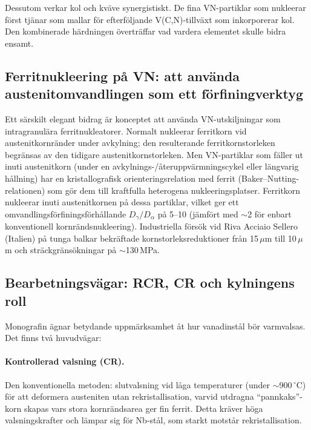 \documentclass[11pt,a4paper]{article}
\begin{document}
Dessutom verkar kol och kv\"ave synergistiskt.  De fina VN-partiklar som
nukleerar f\"orst tj\"anar som mallar f\"or efterf\"oljande V(C,N)-tillv\"axt
som inkorporerar kol.  Den kombinerade h\"ardningen \"overtr\"affar
vad vardera elementet skulle bidra ensamt.

\subsection{Ferritnukleering p\aa{} VN: att anv\"anda austenitomvandlingen
  som ett f\"orfiningverktyg}

Ett s\"arskilt elegant bidrag \"ar konceptet att anv\"anda
VN-utskiljningar som intragranul\"ara ferritnukleatorer.  Normalt
nukleerar ferritkorn vid austenitkornr\"ander under avkylning; den
resulterande ferritkornstorleken begr\"ansas av den tidigare
austenitkornstorleken.  Men VN-partiklar som f\"aller ut inuti
austenitkorn (under en avkylnings-/\aa{}teruppv\"armningscykel eller
l\"angvarig h\aa{}llning) har en kristallografisk orienteringsrelation
med ferrit (Baker--Nutting-relationen) som g\"or dem till kraftfulla
heterogena nukleeringsplatser.  Ferritkorn nukleerar inuti
austenitkornen p\aa{} dessa partiklar, vilket ger ett
omvandlingsf\"orfiningsf\"orh\aa{}llande $D_\gamma/D_\alpha$ p\aa{}
5--10 (j\"amf\"ort med $\sim$2 f\"or enbart konventionell
kornr\"andsnukleering).  Industriella f\"ors\"ok vid Riva Acciaio Sellero
(Italien) p\aa{} tunga balkar bekr\"aftade kornstorlek\-sreduktioner
fr\aa{}n 15\,$\mu$m till 10\,$\mu$m och str\"ackgr\"ans\"okningar p\aa{}
$\sim$130\,MPa.

\subsection{Bearbetningsv\"agar: RCR, CR och kylningens roll}

Monografin \"agnar betydande uppm\"arksamhet \aa{}t hur vanadinst\aa{}l
b\"or varmvalsas.  Det finns tv\aa{} huvudv\"agar:

\paragraph{Kontrollerad valsning (CR).} Den konventionella metoden:
slutvalsning vid l\aa{}ga temperaturer (under $\sim$900\,${}^\circ$C) f\"or
att deformera austeniten utan rekristallisation, varvid utdragna
``pannkaks''-korn skapas vars stora kornr\"andsarea ger fin ferrit.
Detta kr\"aver h\"oga valsningskrafter och l\"ampar sig f\"or
Nb-st\aa{}l, som starkt motst\aa{}r rekristallisation.
\end{document}
